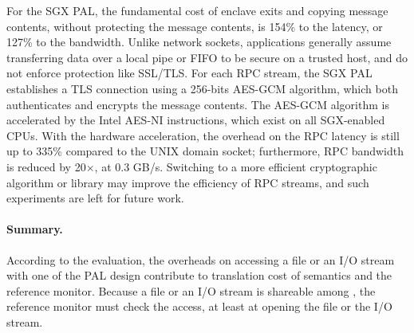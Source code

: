 For the SGX PAL,
the fundamental cost of enclave exits and copying message contents,
without protecting the message contents,
is \roughly{}154\% to the latency,
or \roughly{}127\% to the bandwidth.
Unlike network sockets, 
applications generally assume transferring data over a local pipe or FIFO to be secure on a trusted host, and do not enforce protection like SSL/TLS.
For each RPC stream, the SGX PAL establishes a TLS connection using a 256-bits AES-GCM algorithm, which both authenticates and encrypts the message contents.
The AES-GCM algorithm is accelerated by the Intel AES-NI instructions, which exist on all SGX-enabled CPUs.
With the hardware acceleration,
the overhead on the RPC latency is still up to \roughly{}335\% compared to the UNIX domain socket;
furthermore, RPC bandwidth
is reduced by \roughly{}20$\times$, at \roughly{}0.3 GB/s.
Switching to a more efficient cryptographic algorithm or library may improve the efficiency of RPC streams,
and such experiments are left for future work.






\paragraph{Summary.}
According to the evaluation, the overheads on accessing a file or an I/O stream
with one of the PAL design
contribute to translation cost of \thehostabi{} semantics
and the reference monitor.
Because a file or an I/O stream
is shareable among \picoprocs{}, the reference monitor
must check the access, at least
at opening the file or the I/O stream.





